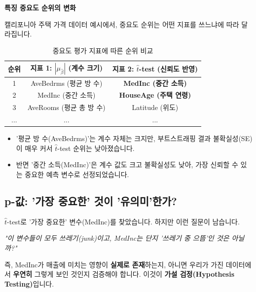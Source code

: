 \documentclass[11pt,a4paper]{book}
\theoremstyle{definition}
\begin{document}
\begin{summarybox}
\textbf{특징 중요도 순위의 변화}

캘리포니아 주택 가격 데이터 예시에서, 중요도 순위는 어떤 지표를 쓰느냐에 따라 달라집니다.

\begin{table}[h!]
\caption{중요도 평가 지표에 따른 순위 비교}
\label{tab:importance}
\centering
\begin{tabular}{@{}ccc@{}}
\toprule
\textbf{순위} & \textbf{지표 1: $|\mu_{\hat{\beta}}|$ (계수 크기)} & \textbf{지표 2: $\hat{t}$-test (신뢰도 반영)} \\
\midrule
1 & AveBedrms (평균 방 수) & \textbf{MedInc (중간 소득)} \\
2 & MedInc (중간 소득) & \textbf{HouseAge (주택 연령)} \\
3 & AveRooms (평균 총 방 수) & Latitude (위도) \\
... & ... & ... \\
\bottomrule
\end{tabular}
\end{table}

\begin{itemize}
    \item '평균 방 수(AveBedrms)'는 계수 자체는 크지만, 부트스트래핑 결과 불확실성(SE)이 매우 커서 $\hat{t}$-test 순위는 낮아졌습니다.
    \item 반면 '중간 소득(MedInc)'은 계수 값도 크고 불확실성도 낮아, 가장 신뢰할 수 있는 중요한 예측 변수로 선정되었습니다.
\end{itemize}
\end{summarybox}

\subsection{p-값: '가장 중요한' 것이 '유의미'한가?}

$\hat{t}$-test로 '가장 중요한' 변수(MedInc)를 찾았습니다. 하지만 이런 질문이 남습니다.

\textit{"이 변수들이 모두 쓰레기(junk)이고, MedInc는 단지 '쓰레기 중 으뜸'인 것은 아닐까?"}

즉, MedInc가 매출에 미치는 영향이 \textbf{실제로 존재}하는지, 아니면 우리가 가진 데이터에서 \textbf{우연히} 그렇게 보인 것인지 검증해야 합니다. 이것이 \textbf{가설 검정(Hypothesis Testing)}입니다.
\end{document}
